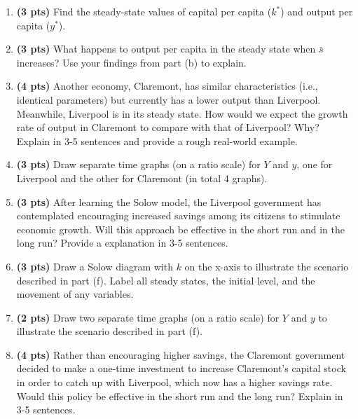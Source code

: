 \documentclass[14pt, oneside]{memoir}
\begin{document}
\begin{enumerate}[label=\textbf{\arabic*.}, itemsep=15pt]
\begin{enumerate}[label=(\alph*)]
	\clearpage
	\item \textbf{(3 pts)} Find the steady-state values of capital per capita (\(k^*\)) and output per capita (\(y^*\)).
	
	\vspace{12cm}
	\item \textbf{(3 pts)} What happens to output per capita in the steady state when \(\bar{s}\) increases? Use your findings from part (b) to explain.
	
	\clearpage
	\item \textbf{(4 pts)} Another economy, Claremont, has similar characteristics (i.e., identical parameters) but currently has a lower output than Liverpool. Meanwhile, Liverpool is in its steady state. How would we expect the growth rate of output in Claremont to compare with that of Liverpool? Why? Explain in 3-5 sentences and provide a rough real-world example.
	
	\vspace{5cm}
	\item \textbf{(3 pts)} Draw separate time graphs (on a ratio scale) for $Y$ and $y$, one for Liverpool and the other for Claremont (in total 4 graphs).
	
	\clearpage
	\item \textbf{(3 pts)} After learning the Solow model, the Liverpool government has contemplated encouraging increased savings among its citizens to stimulate economic growth. Will this approach be effective in the short run and in the long run? Provide a explanation in 3-5 sentences.
	
	\vspace{6cm}
	\item \textbf{(3 pts)} Draw a Solow diagram with \( k \) on the x-axis to illustrate the scenario described in part (f). Label all steady states, the initial level, and the movement of any variables.
	
	\clearpage
	\item \textbf{(2 pts)} Draw two separate time graphs (on a ratio scale) for $Y$ and $y$ to illustrate the scenario described in part (f).
	
	\vspace{10cm}
	\item \textbf{(4 pts)} Rather than encouraging higher savings, the Claremont government decided to make a one-time investment to increase Claremont’s capital stock in order to catch up with Liverpool, which now has a higher savings rate. Would this policy be effective in the short run and the long run? Explain in 3-5 sentences.
	

\end{enumerate}
\end{enumerate}
\end{document}

